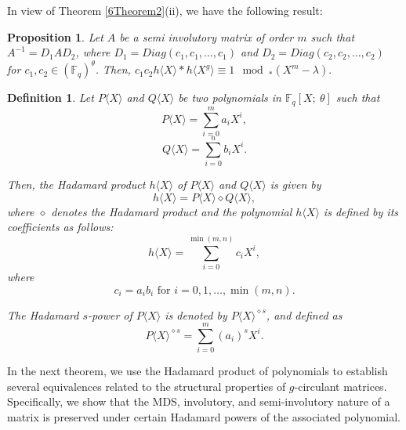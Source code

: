 \documentclass[12pt]{article}
\newtheorem{definition}{Definition}
\newtheorem{proposition}{Proposition}
\begin{document}
 In view of Theorem \ref{6Theorem2}(ii), we have the following result:
\begin{proposition}\label{6Proposition 6}
	Let $A$ be a semi involutory matrix of order $m$ such that $A^{-1}=D_1AD_2$, where $D_1=Diag(c_1,c_1,\dots,c_{1})$ and $D_2=Diag(c_2,c_2,\dots,c_{2})$ for $c_1,c_2\in (\mathbb{F}_q)^\theta$. Then, $c_1c_2h\langle X \rangle\ast h\langle X^g\rangle\equiv 1 \mod_\ast (X^m-\lambda).$
\end{proposition}

\begin{definition}\cite[Definition 1.3]{render1995algebras}
	Let \( P\langle X \rangle\) and \( Q\langle X \rangle \) be two polynomials in $\mathbb{F}_q[X;~\theta]$ such that
	\[
	P  \langle X \rangle = \sum_{i=0}^{m} a_i X^i,
	\]
	\[
	Q  \langle X \rangle = \sum_{i=0}^{n} b_i X^i.
	\]
	
	\noindent Then, the Hadamard product \( h\langle X \rangle\) of \( P \langle X \rangle\) and \( Q \langle X \rangle \) is given by
	\[
	h\langle X \rangle = P  \langle X \rangle \diamond Q  \langle X \rangle,
	\]
	where \( \diamond \) denotes the Hadamard product and the polynomial \( h\langle X \rangle \) is defined by its coefficients as follows:
	\[
	h\langle X \rangle = \sum_{i=0}^{\min(m,n)} c_i X^i,
	\]
	where
	\[
	c_i = a_i b_i \text{ for } i = 0, 1, \ldots, \min(m,n).
	\]
	
	
	
	\noindent The Hadamard \( s \)-power of \( P  \langle X \rangle \) is denoted by \( P  \langle X \rangle^{{\diamond} s} \), and  defined as
	\[
	P  \langle X \rangle^{{\diamond}s} = \sum_{i=0}^{m} (a_i)^s X^i.
	\]
	
\end{definition}


In the next theorem, we use the Hadamard product of polynomials to establish several equivalences related to the structural properties of \( g \)-circulant matrices. Specifically, we show that the MDS, involutory, and semi-involutory nature of a matrix is preserved under certain Hadamard powers of the associated polynomial.
\end{document}
